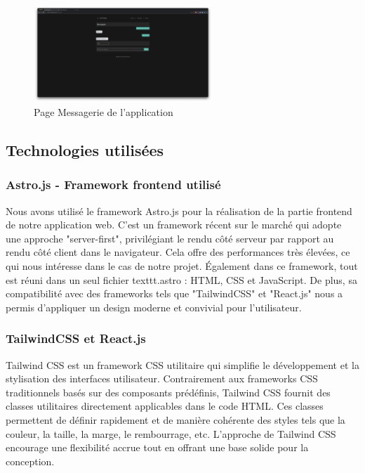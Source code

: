 \documentclass[12pt, a4paper, oneside]{thesis}
\begin{document}
\begin{figure}[h]
    \centering
    \includegraphics[width=0.6\textwidth]{images/PageMessagerieApplication.png}
    \caption{Page Messagerie de l'application}
\end{figure}

\subsection{Technologies utilisées}
\subsubsection{Astro.js - Framework frontend utilisé}
Nous avons utilisé le framework Astro.js pour la réalisation de la partie frontend de notre application web. 
C'est un framework récent sur le marché qui adopte une approche "server-first", privilégiant le rendu côté serveur par rapport au rendu côté client dans le navigateur. 
Cela offre des performances très élevées, ce qui nous intéresse dans le cas de notre projet.
Également dans ce framework, tout est réuni dans un seul fichier texttt{.astro} : HTML, CSS et JavaScript. 
De plus, sa compatibilité avec des frameworks tels que "TailwindCSS" et "React.js" nous a permis d'appliquer un design moderne et convivial pour l'utilisateur.


\subsubsection{TailwindCSS et React.js}
Tailwind CSS est un framework CSS utilitaire qui simplifie le développement et la stylisation des interfaces utilisateur. Contrairement aux frameworks CSS traditionnels basés sur des composants prédéfinis, Tailwind CSS fournit des classes utilitaires directement applicables dans le code HTML. Ces classes permettent de définir rapidement et de manière cohérente des styles tels que la couleur, la taille, la marge, le rembourrage, etc. L'approche de Tailwind CSS encourage une flexibilité accrue tout en offrant une base solide pour la conception.
\end{document}
